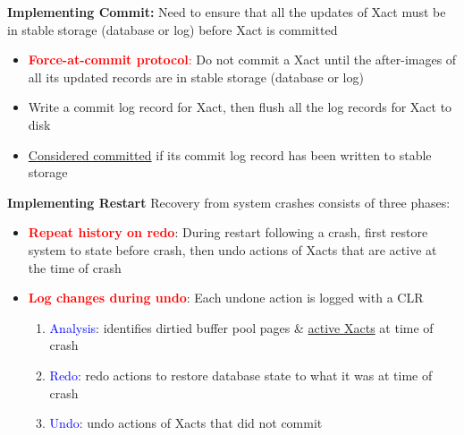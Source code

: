 \documentclass[10pt,landscape]{article}
\newcommand{\1}{\mathmybb{1}}
\begin{document}
\begin{multicols*}{3}
\textbf{Implementing Commit:} Need to ensure that all the updates of Xact must be in stable storage (database or log) before Xact is committed
\begin{itemize}
    \item \textcolor{red}{\textbf{Force-at-commit protocol}:} Do not commit a Xact until the after-images of all its updated records are in stable storage (database or log)
    \item Write a commit log record for Xact, then flush all the log records for Xact to disk
    \item \underline{Considered committed} if its commit log record has been written to stable storage
\end{itemize}

\textbf{Implementing Restart} Recovery from system crashes consists of three phases:
\begin{itemize}
    \item \textcolor{red}{\textbf{Repeat history on redo}}: During restart following a crash, first restore system to state before crash, then undo actions of Xacts that are active at the time of crash
    \item \textcolor{red}{\textbf{Log changes during undo}}: Each undone action is logged with a CLR
    \begin{enumerate}
        \item \textcolor{blue}{Analysis}: identifies dirtied buffer pool pages \& \underline{active Xacts} at time of crash
        \item \textcolor{blue}{Redo}: redo actions to restore database state to what it was at time of crash
        \item \textcolor{blue}{Undo}: undo actions of Xacts that did not commit
    \end{enumerate}
\end{itemize}


\end{multicols*}
\end{document}
